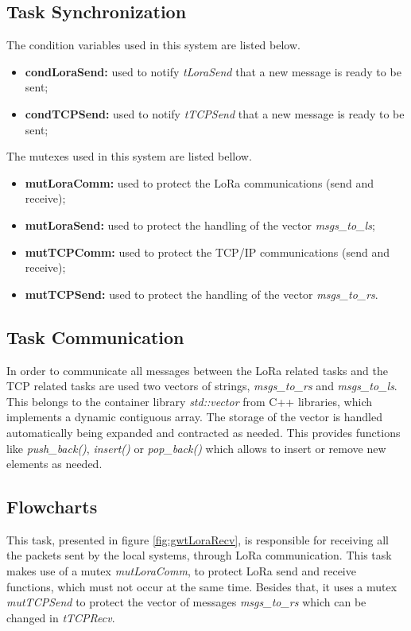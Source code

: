 \subsection{Task Synchronization}

The condition variables used in this system are listed below.

\begin{itemize}
	\item \textbf{condLoraSend:} used to notify \textit{tLoraSend} that a new message is ready to be sent;
	\item \textbf{condTCPSend:} used to notify \textit{tTCPSend} that a new message is ready to be sent;
\end{itemize}

The mutexes used in this system are listed bellow.

\begin{itemize}
	\item \textbf{mutLoraComm:} used to protect the LoRa communications (send and receive);
	\item \textbf{mutLoraSend:}	used to protect the handling of the vector \textit{msgs\_to\_ls};
	
	\item \textbf{mutTCPComm:} used to protect the TCP/IP communications (send and receive);
	\item \textbf{mutTCPSend:} used to protect the handling of the vector \textit{msgs\_to\_rs}.
\end{itemize}

\subsection{Task Communication}
In order to communicate all messages between the LoRa related tasks and the TCP related tasks are used two vectors of strings, \textit{msgs\_to\_rs} and \textit{msgs\_to\_ls}. This belongs to the container library \textit{std::vector} from C++ libraries, which implements a dynamic contiguous array. The storage of the vector is handled automatically being expanded and contracted as needed. This provides functions like \textit{push\_back()}, \textit{insert()} or \textit{pop\_back()} which allows to insert or remove new elements as needed.

\subsection{Flowcharts}
This task, presented in figure \ref{fig:gwtLoraRecv}, is responsible for receiving all the packets sent by the local systems, through LoRa communication. This task makes use of a mutex \textit{mutLoraComm}, to protect LoRa send and receive functions, which must not occur at the same time. Besides that, it uses a mutex \textit{mutTCPSend} to protect the vector of messages \textit{msgs\_to\_rs} which can be changed in \textit{tTCPRecv}.

